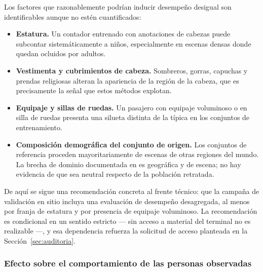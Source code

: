 Los factores que razonablemente podrían inducir desempeño desigual son
identificables aunque no estén cuantificados:

\begin{itemize}[leftmargin=1.5em,itemsep=0.3em]
  \item \textbf{Estatura.} Un contador entrenado con anotaciones de
        cabezas puede subcontar sistemáticamente a niños, especialmente
        en escenas densas donde quedan ocluidos por adultos.
  \item \textbf{Vestimenta y cubrimientos de cabeza.} Sombreros, gorras,
        capuchas y prendas religiosas alteran la apariencia de la región
        de la cabeza, que es precisamente la señal que estos métodos
        explotan.
  \item \textbf{Equipaje y sillas de ruedas.} Un pasajero con equipaje
        voluminoso o en silla de ruedas presenta una silueta distinta de
        la típica en los conjuntos de entrenamiento.
  \item \textbf{Composición demográfica del conjunto de origen.} Los
        conjuntos de referencia proceden mayoritariamente de escenas de
        otras regiones del mundo. La brecha de dominio documentada en
        \cite{Lin_2025_CVPR} es geográfica y de escena; no hay evidencia
        de que sea neutral respecto de la población retratada.
\end{itemize}


De aquí se sigue una recomendación concreta al frente técnico: que la
campaña de validación en sitio incluya una evaluación de desempeño
desagregada, al menos por franja de estatura y por presencia de equipaje
voluminoso. La recomendación es condicional en un sentido estricto ---
sin acceso a material del terminal no es realizable ---, y esa
dependencia refuerza la solicitud de acceso planteada en la
Sección~\ref{sec:auditoria}.

\subsubsection{Efecto sobre el comportamiento de las personas observadas}

